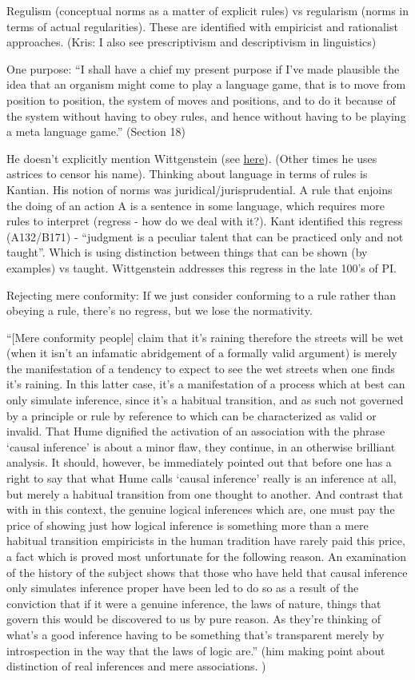 Regulism (conceptual norms as a matter of explicit rules) vs regularism (norms in terms of actual regularities). These are identified with empiricist and rationalist approaches. (Kris: I also see prescriptivism and descriptivism in linguistics)

One purpose: ``I shall have a chief my present purpose if I've made plausible the idea that an organism might come to play a language game, that is to move from position to position, the system of moves and positions, and to do it because of the system without having to obey rules, and hence without having to be playing a meta language game.'' (Section 18)

He doesn't explicitly mention Wittgenstein (see \href{doc/3 jokes/academic/Worst Philosopher}{here}). (Other times he uses astrices to censor his name). Thinking about language in terms of rules is Kantian. His notion of norms was juridical/jurisprudential. A rule that enjoins the doing of an action A is a sentence in some language, which requires more rules to interpret (regress - how do we deal with it?). Kant identified this regress (A132/B171) - ``judgment is a peculiar talent that can be practiced only and not taught''. Which is using distinction between things that can be shown (by examples) vs taught. Wittgenstein addresses this regress in the late 100's of PI.

Rejecting mere conformity: If we just consider conforming to a rule rather than obeying a rule, there's no regress, but we lose the normativity.

``[Mere conformity people] claim that it's raining therefore the streets will be wet (when it isn't an infamatic abridgement of a formally valid argument) is merely the manifestation of a tendency to expect to see the wet streets when one finds it's raining. In this latter case, it's a manifestation of a process which at best can only simulate inference, since it's a habitual transition, and as such not governed by a principle or rule by reference to which can be characterized as valid or invalid. That Hume dignified the activation of an association with the phrase `causal inference' is about a minor flaw, they continue, in an otherwise brilliant analysis. It should, however, be immediately pointed out that before one has a right to say that what Hume calls `causal inference' really is an inference at all, but merely a habitual transition from one thought to another. And contrast that with in this context, the genuine logical inferences which are, one must pay the price of showing just how logical inference is something more than a mere habitual transition empiricists in the human tradition have rarely paid this price, a fact which is proved most unfortunate for the following reason. An examination of the history of the subject shows that those who have held that causal inference only simulates inference proper have been led to do so as a result of the conviction that if it were a genuine inference, the laws of nature, things that govern this would be discovered to us by pure reason.  As they're thinking of what's a good inference having to be something that's transparent merely by introspection in the way that the laws of logic are.'' (him making point about distinction of real inferences and mere associations. )

